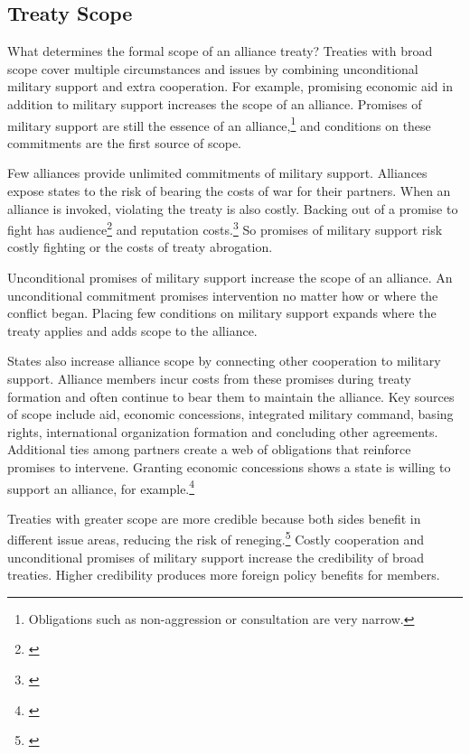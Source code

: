 \documentclass[12pt]{article}
\begin{document}
\subsection{Treaty Scope}


What determines the formal scope of an alliance treaty? 
Treaties with broad scope cover multiple circumstances and issues by combining unconditional military support and extra cooperation.
For example, promising economic aid in addition to military support increases the scope of an alliance.
Promises of military support are still the essence of an alliance,\footnote{Obligations such as non-aggression or consultation are very narrow.} and conditions on these commitments are the first source of scope. 


Few alliances provide unlimited commitments of military support. 
Alliances expose states to the risk of bearing the costs of war for their partners. 
When an alliance is invoked, violating the treaty is also costly. 
Backing out of a promise to fight has audience\footnote{\cite{Levyetal2015}} and reputation costs.\footnote{\cite{Gibler2008, Crescenzietal2012, Mattes2012}} 
So promises of military support risk costly fighting or the costs of treaty abrogation. 


Unconditional promises of military support increase the scope of an alliance. 
An unconditional commitment promises intervention no matter how or where the conflict began. 
Placing few conditions on military support expands where the treaty applies and adds scope to the alliance. 


States also increase alliance scope by connecting other cooperation to military support. 
Alliance members incur costs from these promises during treaty formation and often continue to bear them to maintain the alliance.
Key sources of scope include aid, economic concessions, integrated military command, basing rights, international organization formation and concluding other agreements. 
Additional ties among partners create a web of obligations that reinforce promises to intervene.  
Granting economic concessions shows a state is willing to support an alliance, for example.\footnote{\cite{WolfordKim2017}} 


Treaties with greater scope are more credible because both sides benefit in different issue areas, reducing the risk of reneging.\footnote{\cite{Poast2013}}
Costly cooperation and unconditional promises of military support increase the credibility of broad treaties.
Higher credibility produces more foreign policy benefits for members.
\end{document}
